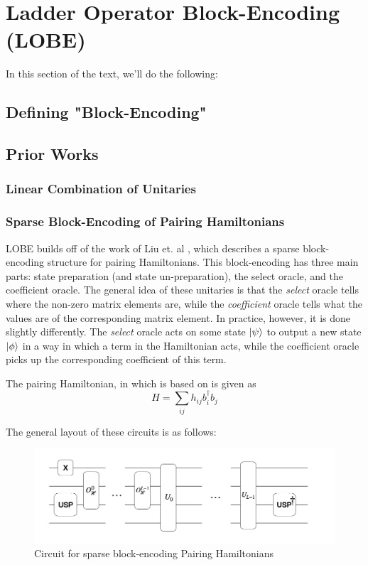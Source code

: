 \section{Ladder Operator Block-Encoding (LOBE)}
\label{sec:lobe}

In this section of the text, we'll do the following:
\subsection{Defining "Block-Encoding"}
\label{subsec:block-encoding}

\subsection{Prior Works}
\label{subsec:prior-works}

\subsubsection{Linear Combination of Unitaries}

\subsubsection{Sparse Block-Encoding of Pairing Hamiltonians}
LOBE builds off of the work of Liu et. al \cite{liu2024efficient}, which describes a sparse block-encoding structure for pairing Hamiltonians. This block-encoding has three main parts: state preparation (and state un-preparation), the select oracle, and the coefficient oracle. The general idea of these unitaries is that the \textit{select} oracle tells where the non-zero matrix elements are, while the \textit{coefficient} oracle tells what the values are of the corresponding matrix element. 
In practice, however, it is done slightly differently. The \textit{select} oracle acts on some state $\ket{\psi}$ to output a new state $\ket{\phi}$ in a way in which a term in the Hamiltonian acts, while the coefficient oracle picks up the corresponding coefficient of this term. 

The pairing Hamiltonian, in which \cite{liu2024efficient} is based on is given as 
\begin{equation}
    H = \sum_{ij}h_{ij}b^\dagger_i b_j
\end{equation}

The general layout of these circuits is as follows: 

\begin{figure}[h]
    \includegraphics[width = \linewidth]{figures/SBE.png}
    \caption{Circuit for sparse block-encoding Pairing Hamiltonians}
\end{figure}

